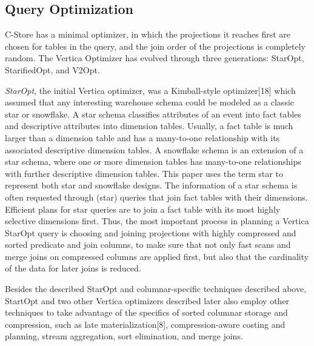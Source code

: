 \documentclass[a4paper,12pt,notitlepage,twoside,openright]{article}
\begin{document}
\hypertarget{query-optimization}{%
\subsection{Query Optimization}\label{query-optimization}}

C-Store has a minimal optimizer, in which the projections it reaches
first are chosen for tables in the query, and the join order of the
projections is completely random. The Vertica Optimizer has evolved
through three generations: StarOpt, StarifiedOpt, and V2Opt.

\emph{StarOpt}, the initial Vertica optimizer, was a Kimball-style
optimizer{[}18{]} which assumed that any interesting warehouse schema
could be modeled as a classic star or snowflake. A star schema
classifies attributes of an event into fact tables and descriptive
attributes into dimension tables. Usually, a fact table is much larger
than a dimension table and has a many-to-one relationship with its
associated descriptive dimension tables. A snowflake schema is an
extension of a star schema, where one or more dimension tables has
many-to-one relationships with further descriptive dimension tables.
This paper uses the term star to represent both star and snowflake
designs. The information of a star schema is often requested through
(star) queries that join fact tables with their dimensions. Efficient
plans for star queries are to join a fact table with its most highly
selective dimensions first. Thus, the most important process in planning
a Vertica StarOpt query is choosing and joining projections with highly
compressed and sorted predicate and join columns, to make sure that not
only fast scans and merge joins on compressed columns are applied first,
but also that the cardinality of the data for later joins is reduced.

Besides the described StarOpt and columnar-specific techniques described
above, StartOpt and two other Vertica optimizers described later also
employ other techniques to take advantage of the specifics of sorted
columnar storage and compression, such as late materialization{[}8{]},
compression-aware costing and planning, stream aggregation, sort
elimination, and merge joins.
\end{document}
